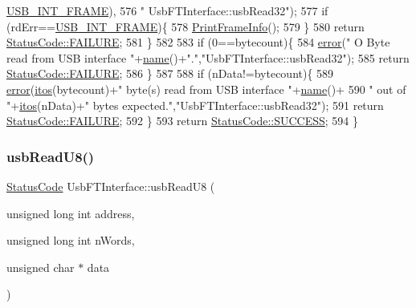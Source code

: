\begin{DoxyCode}
      \hyperlink{LALUsbML_8h_a68260f9cf3649507d12904cfa1592c11afd1c409187b1dfd3d66887a5e07e7ed3}{USB\_INT\_FRAME}),
576             \textcolor{stringliteral}{" UsbFTInterface::usbRead32"});
577     \textcolor{keywordflow}{if} (rdErr==\hyperlink{LALUsbML_8h_a68260f9cf3649507d12904cfa1592c11afd1c409187b1dfd3d66887a5e07e7ed3}{USB\_INT\_FRAME})\{
578       \hyperlink{LALUsbML_8h_ab3398c17204ba7fb4b47eb9bbf4ba94e}{PrintFrameInfo}();
579     \} 
580     \textcolor{keywordflow}{return} \hyperlink{classStatusCode_a6f565cbeadc76d14c72f047e5e85eb4ba3da73d4c469762eb9d3c960368252b26}{StatusCode::FAILURE};
581   \}
582   
583   \textcolor{keywordflow}{if} (0==bytecount)\{
584     \hyperlink{classObject_a204a95f57818c0f811933917a30eff45}{error}(\textcolor{stringliteral}{" O Byte read from USB interface "}+\hyperlink{classObject_a300f4c05dd468c7bb8b3c968868443c1}{name}()+\textcolor{stringliteral}{"."},\textcolor{stringliteral}{"UsbFTInterface::usbRead32"});
585     \textcolor{keywordflow}{return} \hyperlink{classStatusCode_a6f565cbeadc76d14c72f047e5e85eb4ba3da73d4c469762eb9d3c960368252b26}{StatusCode::FAILURE};
586   \}
587 
588   \textcolor{keywordflow}{if} (nData!=bytecount)\{
589     \hyperlink{classObject_a204a95f57818c0f811933917a30eff45}{error}(\hyperlink{Tools_8h_af330027dbdafb9a30768b3613c553e60}{itos}(bytecount)+\textcolor{stringliteral}{" byte(s) read from USB interface "}+\hyperlink{classObject_a300f4c05dd468c7bb8b3c968868443c1}{name}()+
590             \textcolor{stringliteral}{" out of "}+\hyperlink{Tools_8h_af330027dbdafb9a30768b3613c553e60}{itos}(nData)+\textcolor{stringliteral}{" bytes expected."},\textcolor{stringliteral}{"UsbFTInterface::usbRead32"});
591     \textcolor{keywordflow}{return} \hyperlink{classStatusCode_a6f565cbeadc76d14c72f047e5e85eb4ba3da73d4c469762eb9d3c960368252b26}{StatusCode::FAILURE};    
592   \}
593   \textcolor{keywordflow}{return} \hyperlink{classStatusCode_a6f565cbeadc76d14c72f047e5e85eb4badd0da38d3ba0d922efd1f4619bc37ad8}{StatusCode::SUCCESS};
594 \}
\end{DoxyCode}
\mbox{\label{classUsbFTInterface_ab0803dd4c3ce3bf26dff4f4145b34546}} 
\subsubsection{\texorpdfstring{usb\+Read\+U8()}{usbReadU8()}}
{\footnotesize\ttfamily \hyperlink{classStatusCode}{Status\+Code} Usb\+F\+T\+Interface\+::usb\+Read\+U8 (\begin{DoxyParamCaption}\item[{unsigned long int}]{address,  }\item[{unsigned long int}]{n\+Words,  }\item[{unsigned char $\ast$}]{data }\end{DoxyParamCaption})}

